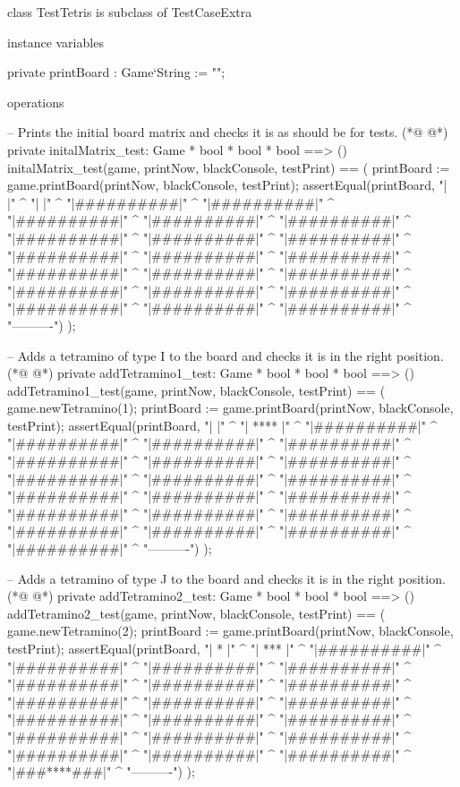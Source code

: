 \begin{vdmpp}[breaklines=true]
class TestTetris is subclass of TestCaseExtra

 instance variables
 
  private printBoard : Game`String := "";
   

 operations
 
  -- Prints the initial board matrix and checks it is as should be for tests.
(*@
\label{initalMatrix:test:11}
@*)
  private initalMatrix_test: Game * bool * bool * bool ==> ()
  initalMatrix_test(game, printNow, blackConsole, testPrint) == (
   printBoard := game.printBoard(printNow, blackConsole, testPrint);
   assertEqual(printBoard, 
    "\n|          |" ^
    "\n|          |" ^
    "\n|##########|" ^
    "\n|##########|" ^
    "\n|##########|" ^
    "\n|##########|" ^
    "\n|##########|" ^
    "\n|##########|" ^
    "\n|##########|" ^
    "\n|##########|" ^
    "\n|##########|" ^
    "\n|##########|" ^
    "\n|##########|" ^
    "\n|##########|" ^
    "\n|##########|" ^
    "\n|##########|" ^
    "\n|##########|" ^
    "\n|##########|" ^
    "\n|##########|" ^
    "\n|##########|" ^
    "\n|##########|" ^
    "\n|##########|" ^
    "\n ----------")
  ); 

  -- Adds a tetramino of type I to the board and checks it is in the right position.
(*@
\label{addTetramino1:test:41}
@*)
  private addTetramino1_test: Game * bool * bool * bool ==> ()
  addTetramino1_test(game, printNow, blackConsole, testPrint) == (  
   game.newTetramino(1);
   printBoard := game.printBoard(printNow, blackConsole, testPrint);
   assertEqual(printBoard, 
    "\n|          |" ^
    "\n|   ****   |" ^
    "\n|##########|" ^
    "\n|##########|" ^
    "\n|##########|" ^
    "\n|##########|" ^
    "\n|##########|" ^
    "\n|##########|" ^
    "\n|##########|" ^
    "\n|##########|" ^
    "\n|##########|" ^
    "\n|##########|" ^
    "\n|##########|" ^
    "\n|##########|" ^
    "\n|##########|" ^
    "\n|##########|" ^
    "\n|##########|" ^
    "\n|##########|" ^
    "\n|##########|" ^
    "\n|##########|" ^
    "\n|##########|" ^
    "\n|##########|" ^
    "\n ----------")
  );

  -- Adds a tetramino of type J to the board and checks it is in the right position.
(*@
\label{addTetramino2:test:72}
@*)
  private addTetramino2_test: Game * bool * bool * bool ==> ()
  addTetramino2_test(game, printNow, blackConsole, testPrint) == (  
   game.newTetramino(2);
   printBoard := game.printBoard(printNow, blackConsole, testPrint);
   assertEqual(printBoard, 
    "\n|   *      |" ^
    "\n|   ***    |" ^
    "\n|##########|" ^
    "\n|##########|" ^
    "\n|##########|" ^
    "\n|##########|" ^
    "\n|##########|" ^
    "\n|##########|" ^
    "\n|##########|" ^
    "\n|##########|" ^
    "\n|##########|" ^
    "\n|##########|" ^
    "\n|##########|" ^
    "\n|##########|" ^
    "\n|##########|" ^
    "\n|##########|" ^
    "\n|##########|" ^
    "\n|##########|" ^
    "\n|##########|" ^
    "\n|##########|" ^
    "\n|##########|" ^
    "\n|###****###|" ^
    "\n ----------")
  );


\end{vdmpp}
